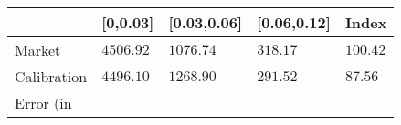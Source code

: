 \begin{tabular}{lllll}
& [0,0.03] & [0.03,0.06] & [0.06,0.12] & Index \\ 
\toprule 
Market & $ 4506.92 $ & $ 1076.74 $ & $ 318.17 $ & $ 100.42 $ \\ 
Calibration & $ 4496.10 $ & $ 1268.90 $ & $ 291.52 $ & $ 87.56 $ \\ 
Error (in %
\end{tabular}